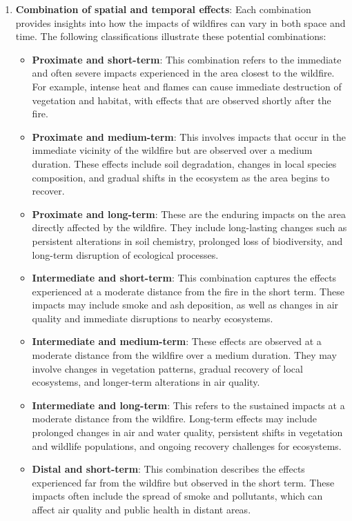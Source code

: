 \documentclass[
  12 pt,
]{Nemilov}
\begin{document}
\begin{enumerate}
\def\labelenumi{\alph{enumi}.}
\setcounter{enumi}{2}
\item
  \textbf{Combination of spatial and temporal effects}: Each combination provides insights into how the impacts of wildfires can vary in both space and time. The following classifications illustrate these potential combinations:

  \begin{itemize}
  \item
    \textbf{Proximate and short-term}: This combination refers to the immediate and often severe impacts experienced in the area closest to the wildfire. For example, intense heat and flames can cause immediate destruction of vegetation and habitat, with effects that are observed shortly after the fire.
  \item
    \textbf{Proximate and medium-term}: This involves impacts that occur in the immediate vicinity of the wildfire but are observed over a medium duration. These effects include soil degradation, changes in local species composition, and gradual shifts in the ecosystem as the area begins to recover.
  \item
    \textbf{Proximate and long-term}: These are the enduring impacts on the area directly affected by the wildfire. They include long-lasting changes such as persistent alterations in soil chemistry, prolonged loss of biodiversity, and long-term disruption of ecological processes.
  \item
    \textbf{Intermediate and short-term}: This combination captures the effects experienced at a moderate distance from the fire in the short term. These impacts may include smoke and ash deposition, as well as changes in air quality and immediate disruptions to nearby ecosystems.
  \item
    \textbf{Intermediate and medium-term}: These effects are observed at a moderate distance from the wildfire over a medium duration. They may involve changes in vegetation patterns, gradual recovery of local ecosystems, and longer-term alterations in air quality.
  \item
    \textbf{Intermediate and long-term}: This refers to the sustained impacts at a moderate distance from the wildfire. Long-term effects may include prolonged changes in air and water quality, persistent shifts in vegetation and wildlife populations, and ongoing recovery challenges for ecosystems.
  \item
    \textbf{Distal and short-term}: This combination describes the effects experienced far from the wildfire but observed in the short term. These impacts often include the spread of smoke and pollutants, which can affect air quality and public health in distant areas.

\end{itemize}
\end{enumerate}
\end{document}
